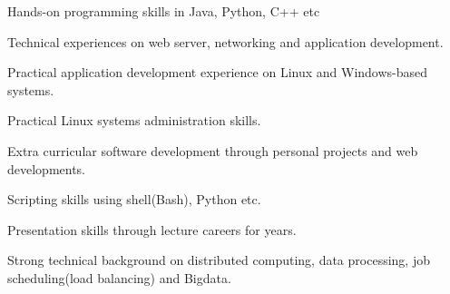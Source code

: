


\begin{cventries}

\begin{cvitems}
\item {Hands-on programming skills in Java, Python, C++ etc}
\item {Technical experiences on web server, networking and application development.}
\item {Practical application development experience on Linux and Windows-based systems.}
\item {Practical Linux systems administration skills.}
\item {Extra curricular software development through personal projects and web developments.}
\item {Scripting skills using shell(Bash), Python etc.}
\item {Presentation skills through lecture careers for years.}
\item {Strong technical background on distributed computing, data processing, job scheduling(load balancing) and Bigdata.}
\newline
\end{cvitems}

\end{cventries}
